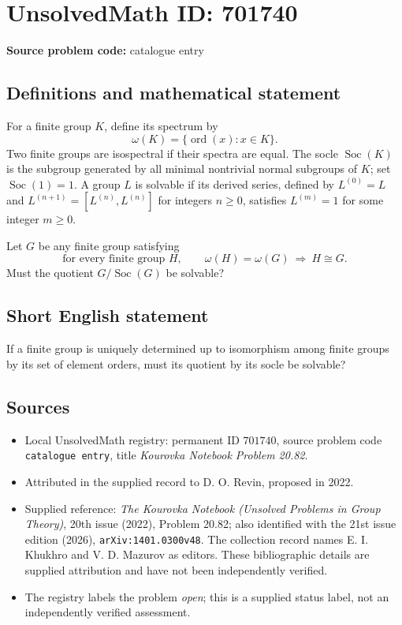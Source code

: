 \documentclass[11pt]{article}
\begin{document}
\section*{UnsolvedMath ID: 701740}
\textbf{Source problem code:} catalogue entry
\subsection{Definitions and mathematical statement}
For a finite group \(K\), define its spectrum by
\[
\omega(K)=\{\operatorname{ord}(x):x\in K\}.
\]
Two finite groups are isospectral if their spectra are equal. The socle \(\operatorname{Soc}(K)\) is the subgroup generated by all minimal nontrivial normal subgroups of \(K\); set \(\operatorname{Soc}(1)=1\). A group \(L\) is solvable if its derived series, defined by \(L^{(0)}=L\) and \(L^{(n+1)}=[L^{(n)},L^{(n)}]\) for integers \(n\geq 0\), satisfies \(L^{(m)}=1\) for some integer \(m\geq 0\).

Let \(G\) be any finite group satisfying
\[
\text{for every finite group }H,\qquad
\omega(H)=\omega(G)\ \Longrightarrow\ H\cong G.
\]
Must the quotient \(G/\operatorname{Soc}(G)\) be solvable?
\subsection{Short English statement}
If a finite group is uniquely determined up to isomorphism among finite groups by its set of element orders, must its quotient by its socle be solvable?
\subsection{Sources}
\begin{itemize}
\item Local UnsolvedMath registry: permanent ID \(701740\), source problem code \texttt{catalogue entry}, title \emph{Kourovka Notebook Problem 20.82}.
\item Attributed in the supplied record to D. O. Revin, proposed in 2022.
\item Supplied reference: \emph{The Kourovka Notebook (Unsolved Problems in Group Theory)}, 20th issue (2022), Problem 20.82; also identified with the 21st issue edition (2026), \texttt{arXiv:1401.0300v48}. The collection record names E. I. Khukhro and V. D. Mazurov as editors. These bibliographic details are supplied attribution and have not been independently verified.
\item The registry labels the problem \emph{open}; this is a supplied status label, not an independently verified assessment.
\end{itemize}
\end{document}
